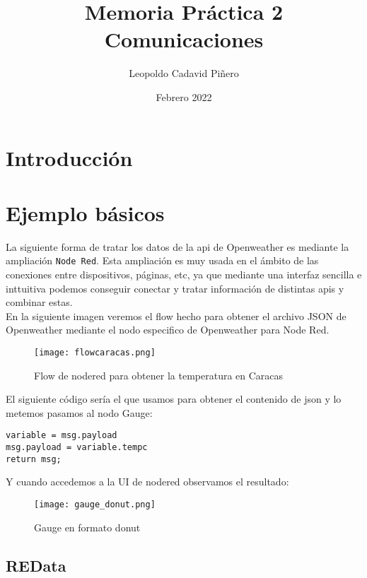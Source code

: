 \documentclass[12pt]{article}
\title{Memoria Práctica 2 \\


\large Comunicaciones
}
\author{
Leopoldo Cadavid Piñero
}
\date{Febrero 2022}
\begin{document}
\maketitle
\tableofcontents

\section{Introducción}
      

\section{Ejemplo básicos}














La siguiente forma de tratar los datos de la api de Openweather es mediante la ampliación \verb|Node Red|. Esta ampliación es 
muy usada en el ámbito de las conexiones entre dispositivos, páginas, etc, ya que mediante una interfaz sencilla e inttuitiva podemos conseguir
conectar y tratar información de distintas apis y combinar estas.\\

En la siguiente imagen veremos el flow hecho para obtener el archivo JSON de Openweather mediante el nodo especifico de Openweather para Node Red.

\begin{figure}[H]
    \centering
    \texttt{[image: flowcaracas.png]}
    \caption{Flow de nodered para obtener la temperatura en Caracas}
    \label{fig: noderedOpenweather}
\end{figure}

El siguiente código sería el que usamos para obtener el contenido de json y lo metemos pasamos al nodo Gauge:
\begin{verbatim}
variable = msg.payload
msg.payload = variable.tempc
return msg;
\end{verbatim}

Y cuando accedemos a la UI  de nodered observamos el resultado:

\begin{figure}[H]
    \centering
    \texttt{[image: gauge\_donut.png]}
    \caption{Gauge en formato donut}
    \label{GaugeCaracas}
\end{figure}

\subsection{REData}
\end{document}

